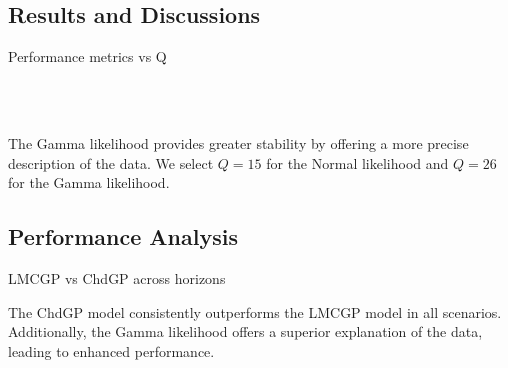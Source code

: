 \subsection{Results and Discussions}

\begin{frame}{Performance metrics vs Q}
	\vspace{-0.8em}
	\begin{figure}[htbp]
		\tiny
		\centering
		\setlength{} 
		\setlength{}
		\subfloat[MSE]{}
		\subfloat[MSLL]{}\\
		\vspace{-1.0em}
		\subfloat[CRPS]{}
		\subfloat[NLPD]{}\\
	\end{figure}
	\vspace{-1.8em}
	\begin{block}{}
		The Gamma likelihood provides greater stability by offering a more precise description of the data. We select $Q=15$ for the Normal likelihood and $Q=26$ for the Gamma likelihood.
	\end{block}
\end{frame}

\subsection{Performance Analysis}
\begin{frame}{LMCGP vs ChdGP across horizons}
	\begin{figure}[htbp]
		\centering
		\tiny
		\setlength{}
		\setlength{}
		
		\subfloat[MSLL]{}
		\hfill
		\subfloat[NLPD]{}
	\end{figure}
	\vspace{-2.0em}
	\begin{block}{}
		The ChdGP model consistently outperforms the LMCGP model in all scenarios. Additionally,  the Gamma likelihood offers a superior explanation of the data, leading to enhanced performance.
	\end{block}
\end{frame}

